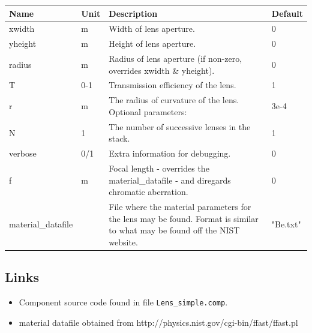 \begin{longtable}{p{}p{}p{}p{}}
\toprule
\textbf{Name} & \textbf{Unit} & \textbf{Description} & \textbf{Default} \\
\midrule
\endhead
xwidth & m & Width of lens aperture. & 0 \\
yheight & m & Height of lens aperture. & 0 \\
radius & m & Radius of lens aperture (if non-zero, overrides xwidth \& yheight). & 0 \\
T & 0-1 & Transmission efficiency of the lens. & 1 \\
r & m & The radius of curvature of the lens. Optional parameters: & 3e-4 \\
N & 1 & The number of successive lenses in the stack. & 1 \\
verbose & 0/1 & Extra information for debugging. & 0 \\
f & m & Focal length - overrides the material\_datafile - and diregards chromatic aberration. & 0 \\
material\_datafile &   & File where the material parameters for the lens may be found. Format is similar to what may be found off the NIST website. & "Be.txt" \\
\bottomrule
\end{longtable}

\subsection*{Links}
\begin{itemize}
  \item Component source code found in file \texttt{Lens\_simple.comp}.
  \item material datafile obtained from http://physics.nist.gov/cgi-bin/ffast/ffast.pl
\end{itemize}
